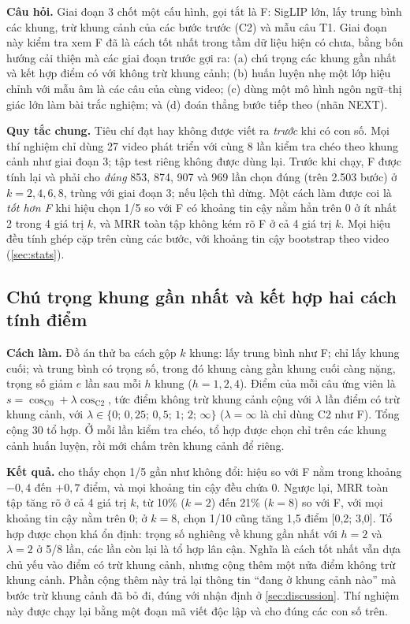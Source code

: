 \documentclass[a4paper,oneside]{report}
\begin{document}
\textbf{Câu hỏi.} Giai đoạn 3 chốt một cấu hình, gọi tắt là F: SigLIP lớn, lấy trung bình các khung, trừ khung cảnh của các bước trước (C2) và mẫu câu T1. Giai đoạn này kiểm tra xem F đã là cách tốt nhất trong tầm dữ liệu hiện có chưa, bằng bốn hướng cải thiện mà các giai đoạn trước gợi ra: (a) chú trọng các khung gần nhất và kết hợp điểm có với không trừ khung cảnh; (b) huấn luyện nhẹ một lớp hiệu chỉnh với mẫu âm là các câu của cùng video; (c) dùng một mô hình ngôn ngữ--thị giác lớn làm bài trắc nghiệm; và (d) đoán thẳng bước tiếp theo (nhãn NEXT).

\textbf{Quy tắc chung.} Tiêu chí đạt hay không được viết ra \textit{trước} khi có con số. Mọi thí nghiệm chỉ dùng 27 video phát triển với cùng 8 lần kiểm tra chéo theo khung cảnh như giai đoạn 3; tập test riêng không được dùng lại. Trước khi chạy, F được tính lại và phải cho \textit{đúng} 853, 874, 907 và 969 lần chọn đúng (trên 2.503 bước) ở $k=2,4,6,8$, trùng với giai đoạn 3; nếu lệch thì dừng. Một cách làm được coi là \textit{tốt hơn F} khi hiệu chọn 1/5 so với F có khoảng tin cậy nằm hẳn trên 0 ở ít nhất 2 trong 4 giá trị $k$, và MRR toàn tập không kém rõ F ở cả 4 giá trị $k$. Mọi hiệu đều tính ghép cặp trên cùng các bước, với khoảng tin cậy bootstrap theo video (\cref{sec:stats}).

\subsection{Chú trọng khung gần nhất và kết hợp hai cách tính điểm}

\textbf{Cách làm.} Đồ án thử ba cách gộp $k$ khung: lấy trung bình như F; chỉ lấy khung cuối; và trung bình có trọng số, trong đó khung càng gần khung cuối càng nặng, trọng số giảm $e$ lần sau mỗi $h$ khung ($h=1,2,4$). Điểm của mỗi câu ứng viên là $s=\cos_{\text{C0}}+\lambda\cos_{\text{C2}}$, tức điểm không trừ khung cảnh cộng với $\lambda$ lần điểm có trừ khung cảnh, với $\lambda\in\{0;\,0{,}25;\,0{,}5;\,1;\,2;\,\infty\}$ ($\lambda=\infty$ là chỉ dùng C2 như F). Tổng cộng 30 tổ hợp. Ở mỗi lần kiểm tra chéo, tổ hợp được chọn chỉ trên các khung cảnh huấn luyện, rồi mới chấm trên khung cảnh để riêng.

\textbf{Kết quả.}  cho thấy chọn 1/5 gần như không đổi: hiệu so với F nằm trong khoảng $-0{,}4$ đến $+0{,}7$ điểm, và mọi khoảng tin cậy đều chứa 0. Ngược lại, MRR toàn tập tăng rõ ở cả 4 giá trị $k$, từ 10\% ($k=2$) đến 21\% ($k=8$) so với F, với mọi khoảng tin cậy nằm trên 0; ở $k=8$, chọn 1/10 cũng tăng 1,5 điểm [0,2; 3,0]. Tổ hợp được chọn khá ổn định: trọng số nghiêng về khung gần nhất với $h=2$ và $\lambda=2$ ở 5/8 lần, các lần còn lại là tổ hợp lân cận. Nghĩa là cách tốt nhất vẫn dựa chủ yếu vào điểm có trừ khung cảnh, nhưng cộng thêm một nửa điểm không trừ khung cảnh. Phần cộng thêm này trả lại thông tin ``đang ở khung cảnh nào'' mà bước trừ khung cảnh đã bỏ đi, đúng với nhận định ở \cref{sec:discussion}. Thí nghiệm này được chạy lại bằng một đoạn mã viết độc lập và cho đúng các con số trên.
\end{document}
